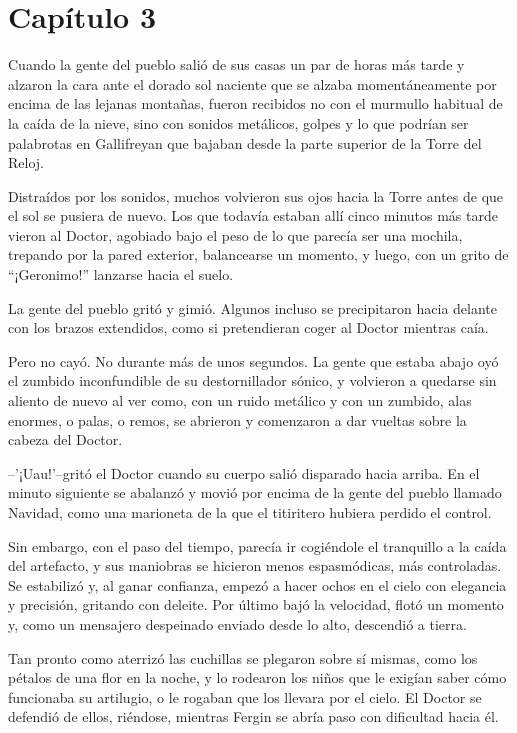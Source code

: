 \chapter*{Capítulo 3}

Cuando la gente del pueblo salió de sus casas un par de horas más tarde y alzaron la cara ante el dorado sol naciente que se alzaba momentáneamente por encima de las lejanas montañas, fueron recibidos no con el murmullo habitual de la caída de la nieve, sino con sonidos metálicos, golpes y lo que podrían ser palabrotas en Gallifreyan que bajaban desde la parte superior de la Torre del Reloj.

Distraídos por los sonidos, muchos volvieron sus ojos hacia la Torre antes de que el sol se pusiera de nuevo. Los que todavía estaban allí cinco minutos más tarde vieron al Doctor, agobiado bajo el peso de lo que parecía ser una mochila, trepando por la pared exterior, balancearse un momento, y luego, con un grito de ``¡Geronimo!'' lanzarse hacia el suelo.

La gente del pueblo gritó y gimió. Algunos incluso se precipitaron hacia delante con los brazos extendidos, como si pretendieran coger al Doctor mientras caía.

Pero no cayó. No durante más de unos segundos. La gente que estaba abajo oyó el zumbido inconfundible de su destornillador sónico, y volvieron a quedarse sin aliento de nuevo al ver como, con un ruido metálico y con un zumbido, alas enormes, o palas, o remos, se abrieron y comenzaron a dar vueltas sobre la cabeza del Doctor.

--'¡Uau!'--gritó el Doctor cuando su cuerpo salió disparado hacia arriba. En el minuto siguiente se abalanzó y movió por encima de la gente del pueblo llamado Navidad, como una marioneta de la que el titiritero hubiera perdido el control.

Sin embargo, con el paso del tiempo, parecía ir cogiéndole el tranquillo a la caída del artefacto, y sus maniobras se hicieron menos espasmódicas, más controladas. Se estabilizó y, al ganar confianza, empezó a hacer ochos en el cielo con elegancia y precisión, gritando con deleite. Por último bajó la velocidad, flotó un momento y, como un mensajero despeinado enviado desde lo alto, descendió a tierra.

Tan pronto como aterrizó las cuchillas se plegaron sobre sí mismas, como los pétalos de una flor en la noche, y lo rodearon los niños que le exigían saber cómo funcionaba su artilugio, o le rogaban que los llevara por el cielo. El Doctor se defendió de ellos, riéndose, mientras Fergin se abría paso con dificultad hacia él.


